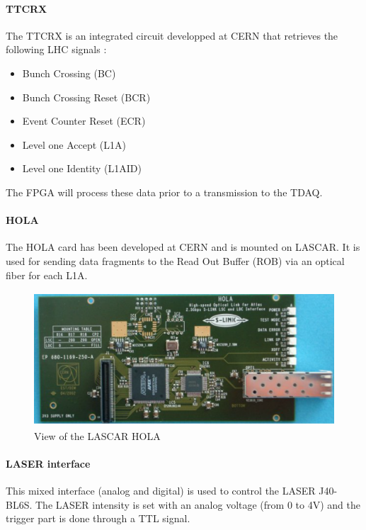 \paragraph{TTCRX}

The TTCRX is an integrated circuit developped at CERN that retrieves the following LHC signals :
\begin{itemize}
\item Bunch Crossing (BC)
\item Bunch Crossing Reset (BCR)
\item Event Counter Reset (ECR)
\item Level one Accept (L1A)
\item Level one Identity (L1AID)
\end{itemize}

The FPGA will process these data prior to  a transmission to the TDAQ.

\paragraph{HOLA}

The HOLA card has been developed at CERN and is mounted on LASCAR. It is used for sending data fragments to the Read Out Buffer (ROB) via an optical fiber for each L1A.
\begin{figure}[htbp]

\centering
\includegraphics[height=5cm]{figures/hola.pdf}
\caption{View of the LASCAR HOLA}\label{fig:laslascarhola}
\end{figure}

\paragraph{LASER interface}

This mixed interface (analog and digital) is used to control the LASER J40-BL6S. The LASER intensity is set with an analog voltage (from 0 to 4V) and the trigger part is done through a TTL signal.

